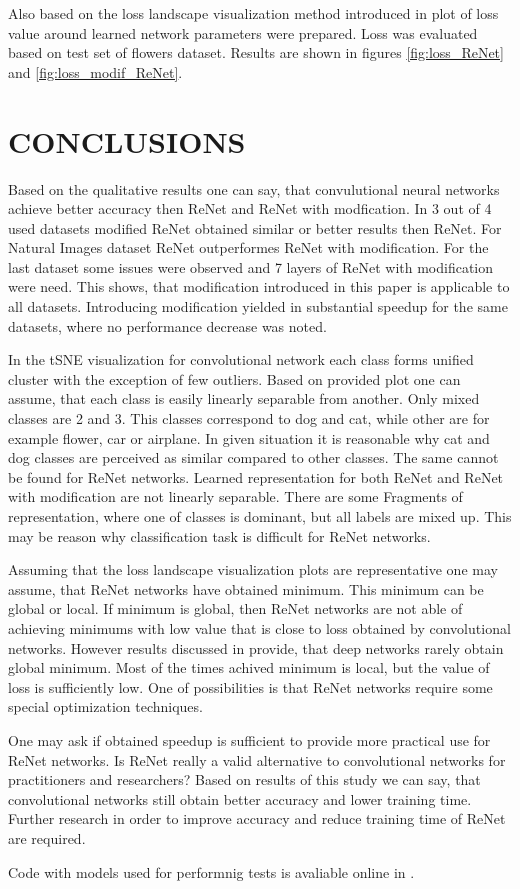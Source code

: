 \documentclass[a4paper, 10 pt, journal]{ieeeconf}
\begin{document}
Also based on the loss landscape visualization method introduced in \cite{DBLP:journals/corr/abs-1712-09913} plot of loss value around learned network parameters were prepared. Loss was evaluated based on test set of flowers dataset. Results are shown in figures \ref{fig:loss_ReNet} and \ref{fig:loss_modif_ReNet}.

\section{CONCLUSIONS}

Based on the qualitative results one can say, that convulutional neural networks achieve better accuracy then ReNet and ReNet with modfication. In 3 out of 4 used datasets modified ReNet obtained similar or better results then ReNet. For Natural Images dataset ReNet outperformes ReNet with modification. For the last dataset some issues were observed and 7 layers of ReNet with modification were need. This shows, that modification introduced in this paper is applicable to all datasets. Introducing modification yielded in substantial speedup for the same datasets, where no performance decrease was noted.

In the tSNE visualization for convolutional network each class forms unified cluster with the exception of few outliers. Based on provided plot one can assume, that each class is easily linearly separable from another. Only mixed classes are 2 and 3. This classes correspond to dog and cat, while other are for example flower, car or airplane. In given situation it is reasonable why cat and dog classes are perceived as similar compared to other classes. The same cannot be found for ReNet networks. Learned representation for both ReNet and ReNet with modification are not linearly separable. There are some Fragments of representation, where one of classes is dominant, but all labels are mixed up. This may be reason why classification task is difficult for ReNet networks.

Assuming that the loss landscape visualization plots are representative one may assume, that ReNet networks have obtained minimum. This minimum can be global or local. If minimum is global, then ReNet networks are not able of achieving minimums with low value that is close to loss obtained by convolutional networks. However results discussed in \cite{Goodfellow-et-al-2016} provide, that deep networks rarely obtain global minimum. Most of the times achived minimum is local, but the value of loss is sufficiently low. One of possibilities is that ReNet networks require some special optimization techniques.

One may ask if obtained speedup is sufficient to provide more practical use for ReNet networks. Is ReNet really a valid alternative to convolutional networks for practitioners and researchers? Based on results of this study we can say, that convolutional networks still obtain better accuracy and lower training time. Further research in order to improve accuracy and reduce training time of ReNet are required.

Code with models used for performnig tests is avaliable online in \cite{repo}.




\end{document}

